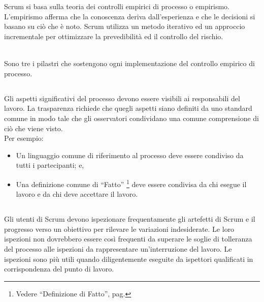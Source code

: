 
\section*{\color{Blue}{La Teoria di Scrum}}%
\label{sec:scrum_theory}
Scrum si basa sulla teoria dei controlli empirici di processo o empirismo. L'empirismo afferma che la conoscenza deriva 
dall'esperienza e che le decisioni si basano su ci\`o che \`e noto. Scrum utilizza un metodo iterativo ed un approccio 
incrementale per ottimizzare la prevedibilit\`a ed il controllo del rischio. 
\newline

\\Sono tre i pilastri che sostengono ogni implementazione del controllo empirico di processo.

\subsection*{\color{SteelBlue}{Trasparenza}}%
\label{sec:transparency}
Gli aspetti significativi  del processo devono essere visibili ai responsabili del lavoro. La trasparenza richiede che quegli 
aspetti siano definiti da uno standard comune in modo tale che gli osservatori condividano una comune comprensione di ci\`o che 
viene visto.
\newline
\\Per esempio:
\begin{itemize}
	\item Un linguaggio comune di riferimento al processo deve essere condiviso da tutti i partecipanti; e,
	\item Una definizione comune di ``Fatto'' \footnote[1]{Vedere ``Definizione di Fatto'', pag. 
	      \pageref{sec:definition_of_done}} deve essere condivisa da chi esegue il lavoro e da chi deve accettare il lavoro.
\end{itemize}

\subsection*{\color{SteelBlue}{Ispezione}}%
\label{sec:inspection}
Gli utenti di Scrum devono ispezionare frequentamente gli artefetti di Scrum e il progresso verso un obiettivo per rilevare le 
variazioni indesiderate. Le loro ispezioni non dovrebbero essere cos\`i frequenti da superare le soglie di tolleranza del 
processo alle ispezioni da rappresentare un'interruzione del lavoro. Le ispezioni sono pi\`u utili quando diligentemente 
eseguite da ispettori qualificati in corrispondenza del punto di lavoro.

